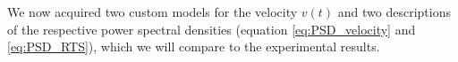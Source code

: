 We now acquired two custom models for the velocity $v(t)$ and two descriptions of the respective power spectral densities (equation \ref{eq:PSD_velocity} and \ref{eq:PSD_RTS}), which we will compare to the experimental results. 

